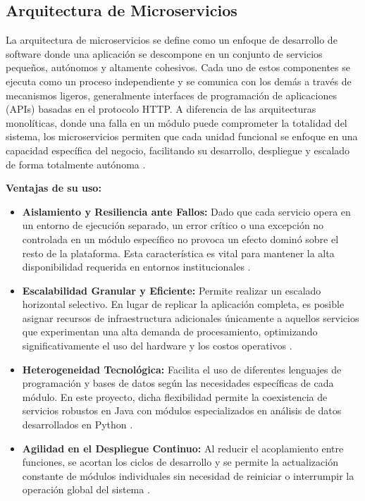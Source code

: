 \subsection{Arquitectura de Microservicios}

La arquitectura de microservicios se define como un enfoque de desarrollo de software donde una aplicación se descompone en un conjunto de servicios pequeños, autónomos y altamente cohesivos. Cada uno de estos componentes se ejecuta como un proceso independiente y se comunica con los demás a través de mecanismos ligeros, generalmente interfaces de programación de aplicaciones (APIs) basadas en el protocolo HTTP. A diferencia de las arquitecturas monolíticas, donde una falla en un módulo puede comprometer la totalidad del sistema, los microservicios permiten que cada unidad funcional se enfoque en una capacidad específica del negocio, facilitando su desarrollo, despliegue y escalado de forma totalmente autónoma \cite{31}.

\textbf{Ventajas de su uso:}
\begin{itemize}
\item \textbf{Aislamiento y Resiliencia ante Fallos:} Dado que cada servicio opera en un entorno de ejecución separado, un error crítico o una excepción no controlada en un módulo específico no provoca un efecto dominó sobre el resto de la plataforma. Esta característica es vital para mantener la alta disponibilidad requerida en entornos institucionales \cite{32} .

\item \textbf{Escalabilidad Granular y Eficiente:} Permite realizar un escalado horizontal selectivo. En lugar de replicar la aplicación completa, es posible asignar recursos de infraestructura adicionales únicamente a aquellos servicios que experimentan una alta demanda de procesamiento, optimizando significativamente el uso del hardware y los costos operativos \cite{32} \cite{29} .

\item \textbf{Heterogeneidad Tecnológica:} Facilita el uso de diferentes lenguajes de programación y bases de datos según las necesidades específicas de cada módulo. En este proyecto, dicha flexibilidad permite la coexistencia de servicios robustos en Java con módulos especializados en análisis de datos desarrollados en Python \cite{32} .

\item \textbf{Agilidad en el Despliegue Continuo:} Al reducir el acoplamiento entre funciones, se acortan los ciclos de desarrollo y se permite la actualización constante de módulos individuales sin necesidad de reiniciar o interrumpir la operación global del sistema \cite{33} .

\end{itemize}

